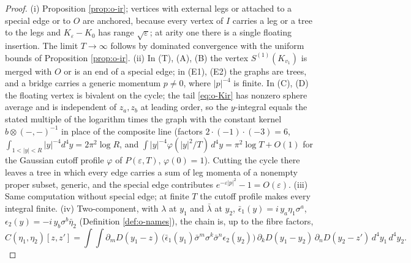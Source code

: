 \begin{theorem}
\begin{itemize}
\end{itemize}
\end{theorem}

\begin{proof}
(i) Proposition \ref{prop:o-ir}; vertices with external legs or attached to a special edge or to $O$ are anchored, because every vertex of $I$ carries a leg or a tree to the legs and $K_\varepsilon-K_0$ has range $\sqrt\varepsilon$; at arity one there is a single floating insertion. The limit $T\to\infty$ follows by dominated convergence with the uniform bounds of Proposition \ref{prop:o-ir}. (ii) In (T), (A), (B) the vertex $S^{(1)}(K_{v_1})$ is merged with $O$ or is an end of a special edge; in (E1), (E2) the graphs are trees, and a bridge carries a generic momentum $p\neq0$, where $|p|^{-4}$ is finite. In (C), (D) the floating vertex is bivalent on the cycle; the tail \eqref{eq:o-Kir} has nonzero sphere average and is independent of $z_a,z_b$ at leading order, so the $y$-integral equals the stated multiple of the logarithm times the graph with the constant kernel $b\otimes(-,-)^{-1}$ in place of the composite line (factors $2\cdot(-1)\cdot(-3)=6$, $\int_{1<|y|<R}|y|^{-4}d^4y=2\pi^2\log R$, and $\int|y|^{-4}\varphi(|y|^2/T)\,d^4y=\pi^2\log T+O(1)$ for the Gaussian cutoff profile $\varphi$ of $P(\varepsilon,T)$, $\varphi(0)=1$). Cutting the cycle there leaves a tree in which every edge carries a sum of leg momenta of a nonempty proper subset, generic, and the special edge contributes $e^{-\varepsilon|p|^2}-1=O(\varepsilon)$. (iii) Same computation without special edge; at finite $T$ the cutoff profile makes every integral finite. (iv) Two-component, with $\lambda$ at $y_1$ and $\bar\lambda$ at $y_2$, $\bar\epsilon_1(y)=i\,y_a\eta_1\sigma^a$, $\epsilon_2(y)=-i\,y_b\sigma^b\bar\eta_2$ (Definition \ref{def:o-names}), the chain is, up to the fibre factors,
\begin{equation}
C(\eta_1,\eta_2)[z,z']=\int\!\!\int\partial_mD(y_1-z)\,\big(\bar\epsilon_1(y_1)\bar\sigma^m\sigma^k\bar\sigma^n\epsilon_2(y_2)\big)\,\partial_kD(y_1-y_2)\,\partial_nD(y_2-z')\,d^4y_1\,d^4y_2 .
\label{eq:o-pair}
\end{equation}

\end{proof}
